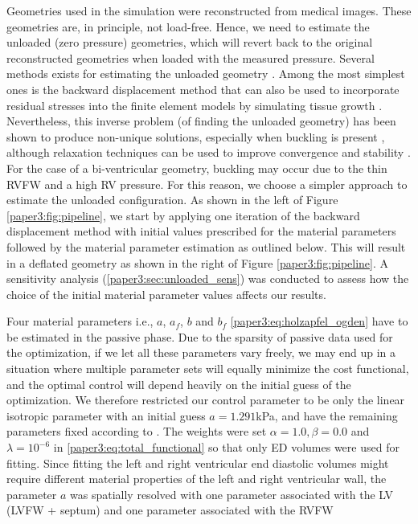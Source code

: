 Geometries used in the simulation were reconstructed from medical
images. These geometries are, in principle, not load-free. Hence, we
need to estimate the unloaded (zero pressure) geometries, which  will
revert  back to the original reconstructed geometries when loaded with
the measured pressure. Several methods exists for estimating the
unloaded geometry \citep{govindjee1996computational,gee2010computational}. 
Among the most simplest ones is the backward displacement method
\citep{sellier2011JFS,bols2013computational} that can also be used to
incorporate residual stresses into the finite element models by
simulating tissue growth \citep{Genet2015JB}. Nevertheless, this
inverse problem (of finding the unloaded geometry) has  been shown to
produce non-unique solutions, especially when buckling is present
\citep{govindjee1996computational}, although relaxation techniques can
be used to improve convergence and stability \citep{Rausch2017JB}. For
the case of a bi-ventricular geometry, buckling may occur due to the
thin RVFW and a high RV pressure. For this reason, we choose a simpler
approach to estimate  the unloaded configuration. As shown in the left
of Figure \ref{paper3:fig:pipeline}, we start by applying one iteration of
the backward displacement method with initial values prescribed for
the material parameters followed by the material parameter estimation
as outlined below. This will result in a deflated geometry as shown in
the right of Figure \ref{paper3:fig:pipeline}. A sensitivity analysis
(\ref{paper3:sec:unloaded_sens}) was conducted to assess how the choice of
the initial material parameter values affects our results. 


Four material parameters i.e., $a$, $a_f$, $b$ and $b_f$
\eqref{paper3:eq:holzapfel_ogden} have to be estimated in the passive phase.
Due to the sparsity of passive data used for the optimization, if we
let all these parameters vary freely, we may end up in a situation
where multiple parameter sets will equally minimize the cost functional, and the
optimal control will depend heavily on the initial guess of the optimization.
We therefore restricted our control parameter to be only the linear
isotropic parameter with an initial guess $a=1.291$kPa, and have the
remaining parameters fixed according to \citep[Table 2, case
P2]{asner2015estimation}. The weights were set $\alpha = 1.0, \beta =
0.0$ and $\lambda = 10^{-6}$ in \eqref{paper3:eq:total_functional} so that
only ED volumes were used for fitting.  
Since fitting the left and right ventricular
end diastolic volumes might require different material
properties of the left and right ventricular wall, the parameter $a$ was
spatially resolved with one parameter associated with the LV (LVFW +
septum) and one parameter associated with the RVFW


